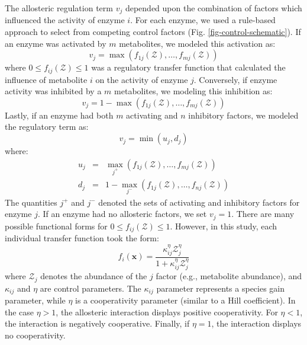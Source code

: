 \documentclass[12pt]{article}
\begin{document}
The allosteric regulation term $v_{j}$ depended upon the combination of factors which influenced the activity of enzyme $i$.
For each enzyme, we used a rule-based approach to select from competing control factors (Fig. \ref{fig-control-schematic}). 
If an enzyme was activated by $m$ metabolites, we modeled this activation as:
\begin{equation}
	v_{j} = \max\left(f_{1j}\left(\mathcal{Z}\right),\hdots,f_{mj}\left(\mathcal{Z}\right)\right)
\end{equation}where $0\leq f_{ij}\left(\mathcal{Z}\right)\leq 1$ was a regulatory transfer function that calculated the influence of metabolite $i$ on the activity of enzyme $j$. 
Conversely, if enzyme activity was inhibited by a $m$ metabolites, we modeling this inhibition as:
\begin{equation}
	v_{j} = 1 - \max\left(f_{1j}\left(\mathcal{Z}\right),\hdots,f_{mj}\left(\mathcal{Z}\right)\right)
\end{equation}Lastly, if an enzyme had both $m$ activating and $n$ inhibitory factors, we modeled the regulatory term as:
\begin{equation}
	v_{j} = \min\left(u_{j},d_{j}\right)
\end{equation}where:
\begin{eqnarray}
	u_{j} &=& \max_{j^{+}}\left(f_{1j}\left(\mathcal{Z}\right),\hdots,f_{mj}\left(\mathcal{Z}\right)\right) \\
	d_{j} &=& 1 - \max_{j^{-}}\left(f_{1j}\left(\mathcal{Z}\right),\hdots,f_{nj}\left(\mathcal{Z}\right)\right)
\end{eqnarray}
The quantities $j^{+}$ and $j^{-}$ denoted the sets of activating and inhibitory factors for enzyme $j$. 
If an enzyme had no allosteric factors, we set $v_{j} = 1$.
There are many possible functional forms for $0\leq f_{ij}\left(\mathcal{Z}\right)\leq 1$. 
However, in this study, each individual transfer function took the form:
\begin{equation}\label{eqn:control-factor}
	f_{i}\left(\mathbf{x}\right) = \frac{\kappa_{ij}^{\eta}\mathcal{Z}_{j}^{\eta}}{1 + \kappa_{ij}^{\eta}\mathcal{Z}_{j}^{\eta}}
\end{equation}where $\mathcal{Z}_{j}$ denotes the abundance of the $j$ factor (e.g., metabolite abundance), and $\kappa_{ij}$ and $\eta$ are control parameters. 
The $\kappa_{ij}$ parameter represents a species gain parameter, while $\eta$ is a cooperativity parameter (similar to a Hill coefficient). 
In the case $\eta>1$, the allosteric interaction displays positive cooperativity. For $\eta<1$, the interaction is negatively cooperative. Finally, if $\eta=1$, the interaction displays no cooperativity. 
\end{document}
